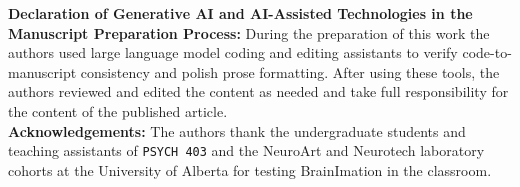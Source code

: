 \documentclass[11pt]{article}
\begin{document}
\noindent\textbf{Declaration of Generative AI and AI-Assisted Technologies in the Manuscript Preparation Process:} During the preparation of this work the authors used large language model coding and editing assistants to verify code-to-manuscript consistency and polish prose formatting. After using these tools, the authors reviewed and edited the content as needed and take full responsibility for the content of the published article.\\[6pt]
\noindent\textbf{Acknowledgements:} The authors thank the undergraduate students and teaching assistants of \texttt{PSYCH 403} and the NeuroArt and Neurotech laboratory cohorts at the University of Alberta for testing BrainImation in the classroom.
\end{document}
